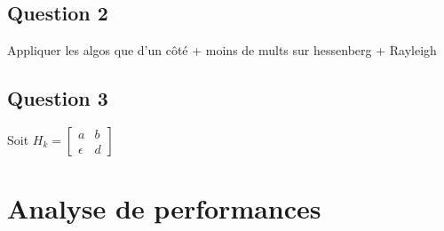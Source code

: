 \documentclass[11pt]{article}
\begin{document}
\subsection*{Question 2}
Appliquer les algos que d'un côté + moins de mults sur hessenberg + Rayleigh

\subsection*{Question 3}
Soit $H_k = \left[\begin{array}{cc} a & b\\ \epsilon & d \end{array}\right]$ 

\section*{Analyse de performances}
\end{document}

